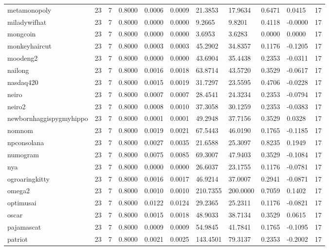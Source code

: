 \begin{table}[htbp]
\begin{tabular}{lllllllllll}
metamonopoly & 23 & 7 & 0.8000 & 0.0006 & 0.0009 & 21.3853 & 17.9634 & 0.6471 & 0.0415 & 17 \\
miladywifhat & 23 & 7 & 0.8000 & 0.0000 & 0.0000 & 9.2665 & 9.8201 & 0.4118 & -0.0000 & 17 \\
mongcoin & 23 & 7 & 0.8000 & 0.0000 & 0.0000 & 3.6953 & 3.6283 & 0.0000 & 0.0000 & 17 \\
monkeyhaircut & 23 & 7 & 0.8000 & 0.0003 & 0.0003 & 45.2902 & 34.8357 & 0.1176 & -0.1205 & 17 \\
moodeng2 & 23 & 7 & 0.8000 & 0.0000 & 0.0000 & 43.6904 & 35.4438 & 0.2353 & -0.0311 & 17 \\
nailong & 23 & 7 & 0.8000 & 0.0016 & 0.0018 & 63.8714 & 43.5720 & 0.3529 & -0.0617 & 17 \\
nasdaq420 & 23 & 7 & 0.8000 & 0.0015 & 0.0019 & 31.7297 & 23.5595 & 0.4706 & -0.0228 & 17 \\
neiro & 23 & 7 & 0.8000 & 0.0007 & 0.0007 & 28.4541 & 24.3234 & 0.2353 & -0.0794 & 17 \\
neiro2 & 23 & 7 & 0.8000 & 0.0008 & 0.0010 & 37.3058 & 30.1259 & 0.2353 & -0.0383 & 17 \\
newbornhaggispygmyhippo & 23 & 7 & 0.8000 & 0.0001 & 0.0001 & 49.2948 & 37.7156 & 0.3529 & 0.0328 & 17 \\
nomnom & 23 & 7 & 0.8000 & 0.0019 & 0.0021 & 67.5443 & 46.0190 & 0.1765 & -0.1185 & 17 \\
npconsolana & 23 & 7 & 0.8000 & 0.0027 & 0.0035 & 21.6588 & 25.3097 & 0.8235 & 0.1949 & 17 \\
numogram & 23 & 7 & 0.8000 & 0.0075 & 0.0085 & 69.3007 & 47.9403 & 0.3529 & -0.1084 & 17 \\
nya & 23 & 7 & 0.8000 & 0.0000 & 0.0000 & 26.6037 & 23.1755 & 0.1176 & -0.0781 & 17 \\
ogroaringkitty & 23 & 7 & 0.8000 & 0.0016 & 0.0017 & 46.9214 & 37.0007 & 0.2941 & -0.0871 & 17 \\
omega2 & 23 & 7 & 0.8000 & 0.0010 & 0.0010 & 210.7355 & 200.0000 & 0.7059 & 0.1402 & 17 \\
optimusai & 23 & 7 & 0.8000 & 0.0122 & 0.0124 & 29.2365 & 25.2311 & 0.1176 & -0.0821 & 17 \\
oscar & 23 & 7 & 0.8000 & 0.0015 & 0.0018 & 48.9033 & 38.7134 & 0.3529 & 0.0615 & 17 \\
pajamascat & 23 & 7 & 0.8000 & 0.0009 & 0.0009 & 54.9845 & 41.7841 & 0.1765 & -0.1095 & 17 \\
patriot & 23 & 7 & 0.8000 & 0.0021 & 0.0025 & 143.4501 & 79.3137 & 0.2353 & -0.2002 & 17 \\

\end{tabular}
\end{table}

